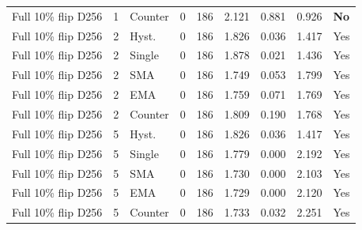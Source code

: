 {\begin{longtable}{lllrrrrrl}
Full 10\% flip D256 & 1 & Counter & 0 & 186 & 2.121 & 0.881 & 0.926 & \textbf{No}\\
Full 10\% flip D256 & 2 & Hyst. & 0 & 186 & 1.826 & 0.036 & 1.417 & Yes\\
Full 10\% flip D256 & 2 & Single & 0 & 186 & 1.878 & 0.021 & 1.436 & Yes\\
Full 10\% flip D256 & 2 & SMA & 0 & 186 & 1.749 & 0.053 & 1.799 & Yes\\
Full 10\% flip D256 & 2 & EMA & 0 & 186 & 1.759 & 0.071 & 1.769 & Yes\\
Full 10\% flip D256 & 2 & Counter & 0 & 186 & 1.809 & 0.190 & 1.768 & Yes\\
Full 10\% flip D256 & 5 & Hyst. & 0 & 186 & 1.826 & 0.036 & 1.417 & Yes\\
Full 10\% flip D256 & 5 & Single & 0 & 186 & 1.779 & 0.000 & 2.192 & Yes\\
Full 10\% flip D256 & 5 & SMA & 0 & 186 & 1.730 & 0.000 & 2.103 & Yes\\
Full 10\% flip D256 & 5 & EMA & 0 & 186 & 1.729 & 0.000 & 2.120 & Yes\\
Full 10\% flip D256 & 5 & Counter & 0 & 186 & 1.733 & 0.032 & 2.251 & Yes\\
\end{longtable}}
\par\medskip
